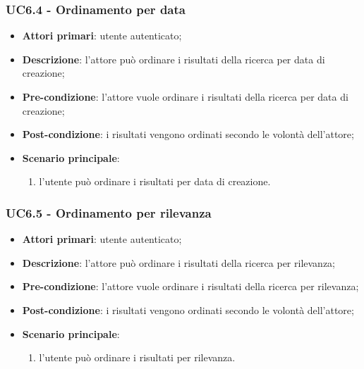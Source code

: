 \subsubsection{UC6.4 - Ordinamento per data}

\begin{itemize}
\item \textbf{Attori primari}: utente autenticato;

\item \textbf{Descrizione}:  l'attore può ordinare i risultati della ricerca per data di creazione;

\item \textbf{Pre-condizione}: l'attore vuole ordinare i risultati della ricerca per data di creazione;

\item \textbf{Post-condizione}: i risultati vengono ordinati secondo le volontà dell'attore;

\item \textbf{Scenario principale}:
\begin{enumerate}
\item l'utente può ordinare i risultati per data di creazione.
\end{enumerate}
\end{itemize}

\subsubsection{UC6.5 - Ordinamento per rilevanza}

\begin{itemize}
\item \textbf{Attori primari}: utente autenticato;

\item \textbf{Descrizione}:  l'attore può ordinare i risultati della ricerca per rilevanza;

\item \textbf{Pre-condizione}: l'attore vuole ordinare i risultati della ricerca per rilevanza;

\item \textbf{Post-condizione}: i risultati vengono ordinati secondo le volontà dell'attore;

\item \textbf{Scenario principale}:
\begin{enumerate}
\item l'utente può ordinare i risultati per rilevanza.
\end{enumerate}
\end{itemize}

